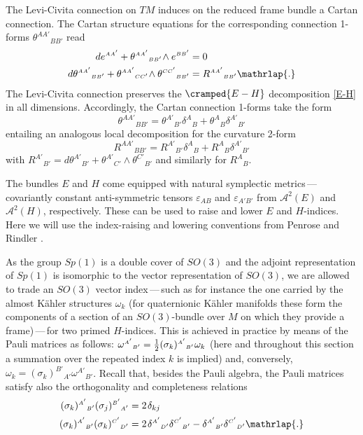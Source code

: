 \documentclass[11pt]{amsart}
\theoremstyle{remark}
\theoremstyle{remark}
\theoremstyle{definition}
\theoremstyle{definition}
\theoremstyle{definition}
\newcommand{\0}{{\scriptstyle 0'}} %
\newcommand{\1}{{\scriptstyle 1'}}
\newcommand{\A}{{\scriptscriptstyle A}} %
\newcommand{\B}{{\scriptscriptstyle B}}
\newcommand{\C}{{\scriptscriptstyle C}}
\newcommand{\D}{{\scriptscriptstyle D}}
\newcommand{\pt}{\hspace{1pt}} %
\newcommand{\hp}{\hspace{0.5pt}} %
\begin{document}
The Levi-Civita connection on $TM$ induces on the reduced frame bundle a Cartan connection. The Cartan structure equations for the corresponding connection 1-forms $\theta^{\A\A'}{}_{\B\B'}$ read
\begin{equation}
\begin{aligned}
de^{\A\A'} + \theta^{\A\A'}{}_{\B\B'} \!\wedge e^{\B\B'} & = 0 \\
d\theta^{\A\A'}{}_{\B\B'} + \theta^{\A\A'}{}_{\C\C'} \!\wedge \theta^{\C\C'}{}_{\B\B'} & = R^{\A\A'}{}_{\B\B'} \mathrlap{.}
\end{aligned}
\end{equation}
The Levi-Civita connection preserves the $\cramped{E-H}$ decomposition \eqref{E-H} in all dimensions. Accordingly, the Cartan connection 1-forms take the form
\begin{equation}
\theta^{\A\A'}{}_{\B\B'} = \theta^{\A'}{}_{\B'} \delta^{\A}{}_{\B} + \theta^{\A}{}_{\B} \delta^{\A'}{}_{\B'}
\end{equation}
entailing an analogous local decomposition for the curvature 2-form
\begin{equation}
R^{\A\A'}{}_{\B\B'} = R^{\A'}{}_{\B'} \delta^{\A}{}_{\B} + R^{\A}{}_{\B} \delta^{\A'}{}_{\B'}
\end{equation}
with $R^{\A'}{}_{\B'} = d\theta^{\A'}{}_{\B'} + \theta^{\A'}{}_{\C'} \!\wedge \theta^{\C'}{}_{\B'}$ and similarly for $R^{\A}{}_{\B}$.

The bundles $E$ and $H$ come equipped with natural symplectic metrics\,---\,covariantly constant anti-symmetric tensors $\varepsilon_{\A\B}$ and $\varepsilon_{\A'\B'}$ from $\mathscr{A}^2(E)$ and $\mathscr{A}^2(H)$, respectively. These can be used to raise and lower $E$ and $H$-indices. Here we will use the index-raising and lowering conventions from Penrose and Rindler \cite[p.104 \& ff.]{MR776784}. 

As the group $Sp(1)$ is a double cover of $SO(3)$ and the adjoint representation of $Sp(1)$ is isomorphic to the vector representation of $SO(3)$, we are allowed to trade an $SO(3)$ vector index\,---\,such as for instance the one carried by the almost K\"ahler structures $\omega_k$ (for quaternionic K\"ahler manifolds these form the components of a section of an $SO(3)$-bundle over $M$ on which they provide a frame)\,---\,for two primed $H$-indices. This is achieved in practice by means of the Pauli matrices as follows: $\omega^{\A'}{}_{\B'} = \frac{1}{2} (\sigma_k)^{\A'}{}_{\B'} \hp \omega_k$ (here and throughout this section a summation over the repeated index $k$ is implied) and, conversely, $\omega_k = (\sigma_k)^{\B'}{}_{\A'} \omega^{\A'}{}_{\B'}$. Recall that, besides the Pauli algebra, the Pauli matrices satisfy also the orthogonality and completeness relations 
\begin{equation} \label{Pauli_orthog}
\begin{aligned}
(\sigma_k)^{\A'}{}_{\B'} (\sigma_j)^{\B'}{}_{\A'} & = 2\pt \delta_{kj} \\[1pt]
(\sigma_k)^{\A'}{}_{\B'} (\sigma_k)^{\C'}{}_{\D'} & =  2\pt \delta^{\A'}{}_{\D'}\delta^{\C'}{}_{\B'} - \delta^{\A'}{}_{\B'}\delta^{\C'}{}_{\D'} \mathrlap{.}
\end{aligned}
\end{equation}
\end{document}
